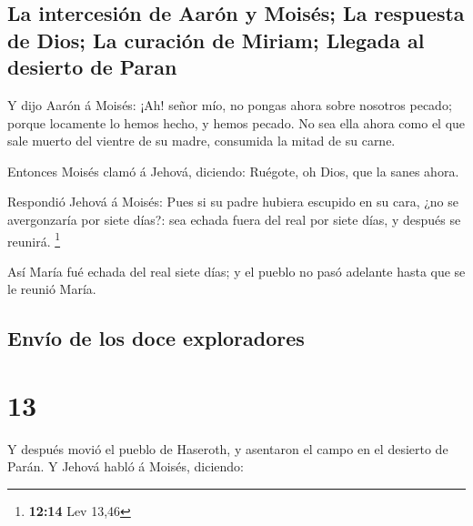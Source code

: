 \hypertarget{la-intercesiuxf3n-de-aaruxf3n-y-moisuxe9s-la-respuesta-de-dios-la-curaciuxf3n-de-miriam-llegada-al-desierto-de-paran}{%
\subsection{La intercesión de Aarón y Moisés; La respuesta de Dios; La
curación de Miriam; Llegada al desierto de
Paran}\label{la-intercesiuxf3n-de-aaruxf3n-y-moisuxe9s-la-respuesta-de-dios-la-curaciuxf3n-de-miriam-llegada-al-desierto-de-paran}}

 Y dijo Aarón á Moisés: ¡Ah! señor mío, no pongas ahora
sobre nosotros pecado; porque locamente lo hemos hecho, y hemos pecado.
 No sea ella ahora como el que sale muerto del vientre de
su madre, consumida la mitad de su carne.

 Entonces Moisés clamó á Jehová, diciendo: Ruégote, oh
Dios, que la sanes ahora.

 Respondió Jehová á Moisés: Pues si su padre hubiera
escupido en su cara, ¿no se avergonzaría por siete días?: sea echada
fuera del real por siete días, y después se reunirá. \footnote{\textbf{12:14}
  Lev 13,46}

 Así María fué echada del real siete días; y el pueblo no
pasó adelante hasta que se le reunió María. 

\hypertarget{envuxedo-de-los-doce-exploradores}{%
\subsection{Envío de los doce
exploradores}\label{envuxedo-de-los-doce-exploradores}}

\hypertarget{section-12}{%
\section{13}\label{section-12}}

 Y después movió el pueblo de Haseroth, y asentaron el
campo en el desierto de Parán.  Y Jehová habló á Moisés,
diciendo:

